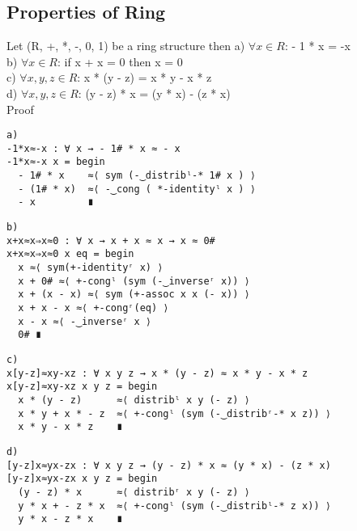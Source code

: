 \subsection{Properties of Ring}
Let (R, +, *, -, 0, 1) be a ring structure then
a) \(\forall x \in R\): - 1 * x = -x\\
b) \(\forall x \in R\): if x + x = 0 then x = 0\\
c) \(\forall x,y,z \in R\): x * (y - z) = x * y - x * z\\
d) \(\forall x,y,z \in R\): (y - z) * x = (y * x) - (z * x)\\
Proof
\begin{Verbatim}
a)
-1*x≈-x : ∀ x → - 1# * x ≈ - x
-1*x≈-x x = begin
  - 1# * x    ≈⟨ sym (-‿distribˡ-* 1# x ) ⟩
  - (1# * x)  ≈⟨ -‿cong ( *-identityˡ x ) ⟩
  - x         ∎
\end{Verbatim}
\begin{Verbatim}
b)
x+x≈x⇒x≈0 : ∀ x → x + x ≈ x → x ≈ 0#
x+x≈x⇒x≈0 x eq = begin
  x ≈⟨ sym(+-identityʳ x) ⟩
  x + 0# ≈⟨ +-congˡ (sym (-‿inverseʳ x)) ⟩
  x + (x - x) ≈⟨ sym (+-assoc x x (- x)) ⟩
  x + x - x ≈⟨ +-congʳ(eq) ⟩
  x - x ≈⟨ -‿inverseʳ x ⟩
  0# ∎
\end{Verbatim}
\begin{Verbatim}
c)
x[y-z]≈xy-xz : ∀ x y z → x * (y - z) ≈ x * y - x * z
x[y-z]≈xy-xz x y z = begin
  x * (y - z)      ≈⟨ distribˡ x y (- z) ⟩
  x * y + x * - z  ≈⟨ +-congˡ (sym (-‿distribʳ-* x z)) ⟩
  x * y - x * z    ∎
\end{Verbatim}
\begin{Verbatim}
d)
[y-z]x≈yx-zx : ∀ x y z → (y - z) * x ≈ (y * x) - (z * x)
[y-z]x≈yx-zx x y z = begin
  (y - z) * x      ≈⟨ distribʳ x y (- z) ⟩
  y * x + - z * x  ≈⟨ +-congˡ (sym (-‿distribˡ-* z x)) ⟩
  y * x - z * x    ∎
\end{Verbatim}